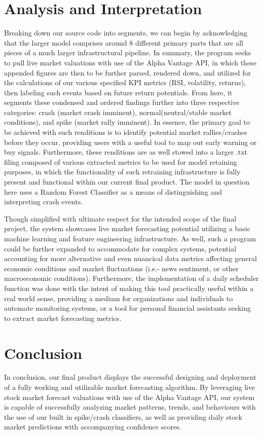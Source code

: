 \documentclass[runningheads]{llncs}
\begin{document}
\section{Analysis and Interpretation}
Breaking down our source code into segments, we can begin by acknowledging that the larger model comprises around 8 different primary parts that are all pieces of a much larger infrastructural pipeline. In summary, the program seeks to pull live market valuations with use of the Alpha Vantage API, in which these appended figures are then to be further parsed, rendered down, and utilized for the calculations of our various specified KPI metrics (RSI, volatility, returns), then labeling such events based on future return potentials. From here, it segments these condensed and ordered findings further into three respective categories: crash (market crash imminent), normal(neutral/stable market conditions), and spike (market rally imminent). In essence, the primary goal to be achieved with such renditions is to identify potential market rallies/crashes before they occur, providing users with a useful tool to map out early warning or buy signals. Furthermore, these renditions are as well stowed into a larger .txt filing composed of various extracted metrics to be used for model retaining purposes, in which the functionality of such retraining infrastructure is fully present and functional within our current final product. The model in question here uses a Random Forest Classifier as a means of distinguishing and interpreting crash events. 

Though simplified with ultimate respect for the intended scope of the final project, the system showcases live market forecasting potential utilizing a basic machine learning and feature engineering infrastructure. As well, such a program could be further expanded to accommodate for complex systems, potential accounting for more alternative and even nuancical data metrics affecting general economic conditions and market fluctuations (i.e.- news sentiment, or other macroeconomic conditions). Furthermore, the implementation of a daily scheduler function was done with the intent of making this tool practically useful within a real world sense, providing a medium for organizations and individuals to automate monitoring systems, or a tool for personal financial assistants seeking to extract market forecasting metrics.

\section{Conclusion}
In conclusion, our final product displays the successful designing and deployment of a fully working and utilizable market forecasting algorithm. By leveraging  live stock market forecast valuations with use of the Alpha Vantage API, our system is capable of successfully analyzing market patterns, trends, and behaviours with the use of our built in spike/crash classifiers, as well as providing daily stock market predictions with accompanying confidence scores. 
\end{document}

